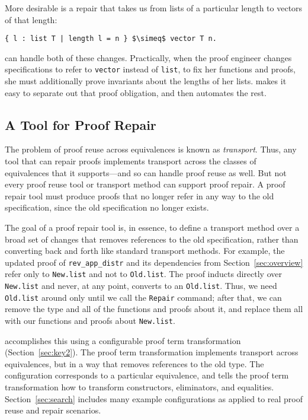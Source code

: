 More desirable is a repair that takes us from lists of a particular length to vectors of that length:

\begin{lstlisting}
{ l : list T | length l = n } $\simeq$ vector T n.
\end{lstlisting}
\toolname can handle both of these changes.
Practically, when the proof engineer changes specifications to refer to \lstinline{vector} instead of \lstinline{list},
to fix her functions and proofs, she must additionally prove invariants about the lengths of her lists.
\toolname makes it easy to separate out that proof obligation, and then automates the rest.

\subsection{A Tool for Proof Repair}
\label{sec:time}

The problem of proof reuse across equivalences is known as \textit{transport}. %
Thus, any tool that can repair proofs implements transport across the classes
of equivalences that it supports---and so can handle proof reuse as well.
But not every proof reuse tool or transport method can support proof repair.
A proof repair tool must produce proofs
that no longer refer in any way to the old specification, since the old specification no longer exists.

The goal of a proof repair tool is, in essence, to
define a transport method over a broad set of changes that
removes references to the old specification, rather than converting back and forth
like standard transport methods.
For example, the updated proof of \lstinline{rev_app_distr} and its dependencies
from Section~\ref{sec:overview} refer only to \lstinline{New.list} and not to \lstinline{Old.list}.
The proof inducts directly over \lstinline{New.list} and never, at any point, converts to an \lstinline{Old.list}.
Thus, we need \lstinline{Old.list} around only until we call the \lstinline{Repair} command;
after that, we can remove the type and all of the functions and proofs about it, and replace them all with
our functions and proofs about \lstinline{New.list}.

\toolname accomplishes this using a configurable proof term transformation (Section~\ref{sec:key2}).
The proof term transformation implements transport across equivalences, but in a way that removes
references to the old type.
The configuration corresponds to a particular equivalence, and tells the proof term transformation how to transform
constructors, eliminators, and equalities.
Section~\ref{sec:search} includes many example configurations as applied to real proof reuse and repair scenarios.


